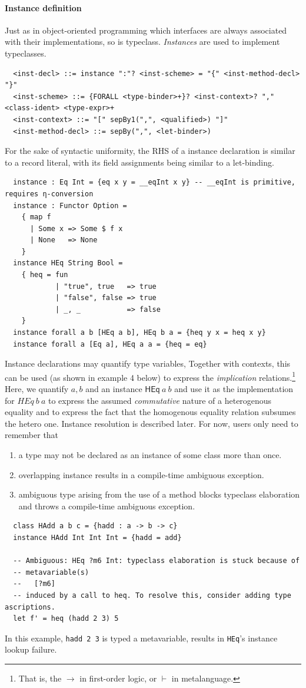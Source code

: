 \documentclass[a4paper, 11pt]{article}
\theoremstyle{remark}\newtheorem*{remark}{Remark}
\theoremstyle{definition}\newtheorem*{definition}{Definition}
\begin{document}
\paragraph{Instance definition}
Just as in object-oriented programming which interfaces are always associated with their implementations,
so is typeclass. \emph{Instances} are used to implement typeclasses.
\begin{verbatim}
  <inst-decl> ::= instance ":"? <inst-scheme> = "{" <inst-method-decl> "}"
  <inst-scheme> ::= {FORALL <type-binder>+}? <inst-context>? "," <class-ident> <type-expr>+
  <inst-context> ::= "[" sepBy1(",", <qualified>) "]"
  <inst-method-decl> ::= sepBy(",", <let-binder>)
\end{verbatim}
For the sake of syntactic uniformity,
the RHS of a instance declaration is similar to a record literal, with its field
assignments being similar to a let-binding.
\begin{verbatim}
  instance : Eq Int = {eq x y = __eqInt x y} -- __eqInt is primitive, requires η-conversion
  instance : Functor Option =
    { map f
      | Some x => Some $ f x
      | None   => None
    }
  instance HEq String Bool =
    { heq = fun
            | "true", true   => true
            | "false", false => true
            | _, _           => false
    }
  instance forall a b [HEq a b], HEq b a = {heq y x = heq x y}
  instance forall a [Eq a], HEq a a = {heq = eq}
\end{verbatim}
Instance declarations may quantify type variables, Together with contexts,
this can be used (as shown in example 4 below) to express the \emph{implication} relations.\footnote{
  That is, the \(\to\) in first-order logic, or \(\vdash\) in metalanguage.
} Here, we quantify \(a, b\) and an instance \(\mathsf{HEq}\ a\ b\) and use it as the implementation for
\(HEq\ b\ a\) to express the assumed \emph{commutative} nature of a heterogenous equality and to express the fact that the homogenous equality relation subsumes the hetero one. Instance resolution
is described later. For now, users only need to remember that
\begin{enumerate}
  \item a type may not be declared as an instance of some class more than once.
  \item overlapping instance results in a compile-time ambiguous exception.
  \item ambiguous type arising from the use of a method blocks typeclass elaboration and throws
    a compile-time ambiguous exception.
\end{enumerate}
\begin{verbatim}
  class HAdd a b c = {hadd : a -> b -> c}
  instance HAdd Int Int Int = {hadd = add}

  -- Ambiguous: HEq ?m6 Int: typeclass elaboration is stuck because of
  -- metavariable(s)
  --   [?m6]
  -- induced by a call to heq. To resolve this, consider adding type ascriptions.
  let f' = heq (hadd 2 3) 5
\end{verbatim}
In this example, \texttt{hadd 2 3} is typed a metavariable, results in \texttt{HEq}'s instance
lookup failure.
\end{document}
